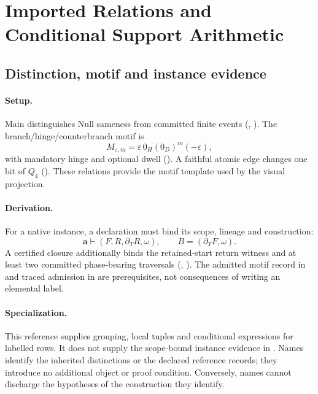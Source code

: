 \section{Imported Relations and Conditional Support Arithmetic}\label{sec:scope-and-spine}

\subsection{Distinction, motif and instance evidence}\label{subsec:sector-scope}
\paragraph{Setup.}
Main distinguishes Null sameness from committed finite events (, ). The branch/hinge/counterbranch motif is
\[
M_{\varepsilon,m}=\varepsilon\,0_H(0_D)^m(-\varepsilon),
\]
with mandatory hinge and optional dwell (). A faithful atomic edge changes one bit of \(Q_4\) (). These relations provide the motif template used by the visual projection.

\paragraph{Derivation.}
For a native instance, a declaration must bind its scope, lineage and construction:
\begin{equation}
\mathbf a\vdash(F,R,\partial_T R,\omega),\qquad B=(\partial_T F,\omega).
\label{eq:matter1-scope-binder}
\end{equation}
A certified closure additionally binds the retained-start return witness and at least two committed phase-bearing traversals (, ). The admitted motif record in  and traced admission in  are prerequisites, not consequences of writing an elemental label.

\paragraph{Specialization.}
This reference supplies grouping, local tuples and conditional expressions for labelled rows. It does not supply the scope-bound instance evidence in . Names identify the inherited distinctions or the declared reference records; they introduce no additional object or proof condition. Conversely, names cannot discharge the hypotheses of the construction they identify.

